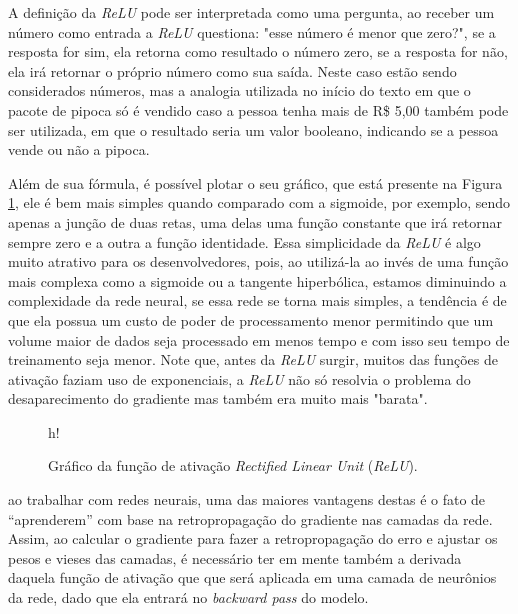 A definição da \textit{ReLU} pode ser interpretada como uma pergunta, ao receber um número como entrada a \textit{ReLU} questiona: "esse número é menor que zero?", se a resposta for sim, ela retorna como resultado o número zero, se a resposta for não, ela irá retornar o próprio número como sua saída. Neste caso estão sendo considerados números, mas a analogia utilizada no início do texto em que o pacote de pipoca só é vendido caso a pessoa tenha mais de R\$ 5,00 também pode ser utilizada, em que o resultado seria um valor booleano, indicando se a pessoa vende ou não a pipoca.

Além de sua fórmula, é possível plotar o seu gráfico, que está presente na Figura \ref{fig:relu}, ele é bem mais simples quando comparado com a sigmoide, por exemplo, sendo apenas a junção de duas retas, uma delas uma função constante que irá retornar sempre zero e a outra a função identidade. Essa simplicidade da \textit{ReLU} é algo muito atrativo para os desenvolvedores, pois, ao utilizá-la ao invés de uma função mais complexa como a sigmoide ou a tangente hiperbólica, estamos diminuindo a complexidade da rede neural, se essa rede se torna mais simples, a tendência é de que ela possua um custo de poder de processamento menor permitindo que um volume maior de dados seja processado em menos tempo e com isso seu tempo de treinamento seja menor. Note que, antes da \textit{ReLU} surgir, muitos das funções de ativação faziam uso de exponenciais, a \textit{ReLU} não só resolvia o problema do desaparecimento do gradiente mas também era muito mais "barata".

\begin{figure}{h!}
    \centering
    \caption{Gráfico da função de ativação \textit{Rectified Linear Unit} (\textit{ReLU}).}
    \label{fig:relu}
\end{figure}

ao trabalhar com redes neurais, uma das maiores vantagens destas é o fato de “aprenderem” com base na retropropagação do gradiente nas camadas da rede. Assim, ao calcular o gradiente para fazer a retropropagação do erro e ajustar os pesos e vieses das camadas, é necessário ter em mente também a derivada daquela função de ativação que que será aplicada em uma camada de neurônios da rede, dado que ela entrará no \textit{backward pass} do modelo.

